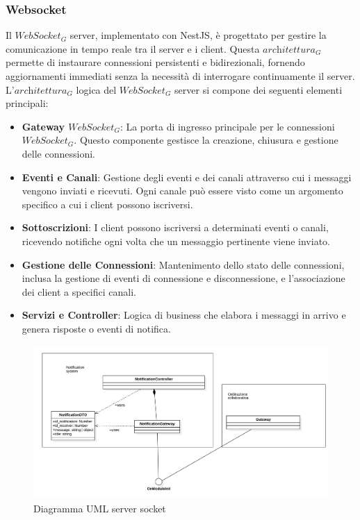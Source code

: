 \subsubsection{Websocket}
Il $\textit{WebSocket}_G$ server, implementato con NestJS, è progettato per gestire la comunicazione in tempo reale tra il server e i client. Questa $\textit{architettura}_G$ permette di instaurare connessioni persistenti e bidirezionali, fornendo aggiornamenti immediati senza la necessità di interrogare continuamente il server.
L'$\textit{architettura}_G$ logica del $\textit{WebSocket}_G$ server si compone dei seguenti elementi principali:
\begin{itemize}
\item \textbf{Gateway $\textit{WebSocket}_G$}: La porta di ingresso principale per le connessioni $\textit{WebSocket}_G$. Questo componente gestisce la creazione, chiusura e gestione delle connessioni.
\item \textbf{Eventi e Canali}: Gestione degli eventi e dei canali attraverso cui i messaggi vengono inviati e ricevuti. Ogni canale può essere visto come un argomento specifico a cui i client possono iscriversi.
\item \textbf{Sottoscrizioni}: I client possono iscriversi a determinati eventi o canali, ricevendo notifiche ogni volta che un messaggio pertinente viene inviato.
\item \textbf{Gestione delle Connessioni}: Mantenimento dello stato delle connessioni, inclusa la gestione di eventi di connessione e disconnessione, e l'associazione dei client a specifici canali.
\item \textbf{Servizi e Controller}: Logica di business che elabora i messaggi in arrivo e genera risposte o eventi di notifica.
\end{itemize}
\begin{figure}[H]
    \centering
    \includegraphics[width=0.95\linewidth]{images/server_websocket_noinfo}
    \caption{Diagramma UML server socket}
    \label{fig:UML-login}
\end{figure}
